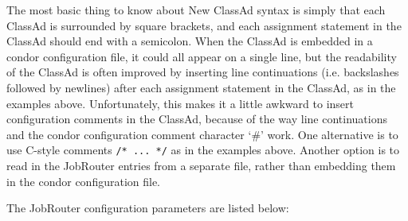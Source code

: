 The most basic thing to know about New ClassAd syntax is simply that
each ClassAd is surrounded by square brackets, and each assignment
statement in the ClassAd should end with a semicolon.  When the
ClassAd is embedded in a condor configuration file, it could all
appear on a single line, but the readability of the ClassAd is often
improved by inserting line continuations (i.e. backslashes followed by
newlines) after each assignment statement in the ClassAd, as in the
examples above.  Unfortunately, this makes it a little awkward to
insert configuration comments in the ClassAd, because of the way line
continuations and the condor configuration comment character `\#' work.
One alternative is to use C-style comments \verb|/* ... */| as in the
examples above.  Another option is to read in the JobRouter entries
from a separate file, rather than embedding them in the condor
configuration file.

The JobRouter configuration parameters are listed below:


